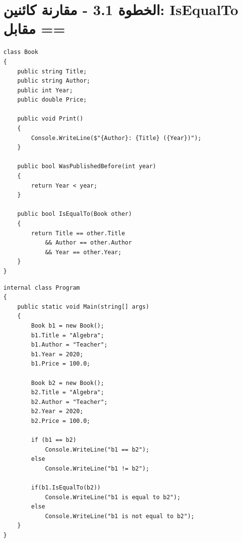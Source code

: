 \documentclass[11pt]{article}
\begin{document}
\section*{الخطوة 3.1 - مقارنة كائنين: \textenglish{IsEqualTo} مقابل \textenglish{==}}
\begin{boxExample}[الخطوة 3.1 - مقارنة كائنين: \textenglish{IsEqualTo} مقابل \textenglish{==}]
\begin{english}
\begin{verbatim}
class Book
{
    public string Title;
    public string Author;
    public int Year;
    public double Price;

    public void Print()
    {
        Console.WriteLine($"{Author}: {Title} ({Year})");
    }

    public bool WasPublishedBefore(int year)
    {
        return Year < year;
    }

    public bool IsEqualTo(Book other)
    {
        return Title == other.Title
            && Author == other.Author
            && Year == other.Year;
    }
}
\end{verbatim}
\end{english}
\end{boxExample}
\begin{boxExample}
\begin{english}
\begin{verbatim}
internal class Program
{
    public static void Main(string[] args)
    {
        Book b1 = new Book();
        b1.Title = "Algebra";
        b1.Author = "Teacher";
        b1.Year = 2020;
        b1.Price = 100.0;

        Book b2 = new Book();
        b2.Title = "Algebra";
        b2.Author = "Teacher";
        b2.Year = 2020;
        b2.Price = 100.0;

        if (b1 == b2)
            Console.WriteLine("b1 == b2");
        else
            Console.WriteLine("b1 != b2");

        if(b1.IsEqualTo(b2))
            Console.WriteLine("b1 is equal to b2");
        else
            Console.WriteLine("b1 is not equal to b2");
    }
}
\end{verbatim}
\end{english}
\end{boxExample}

\clearpage
\end{document}
